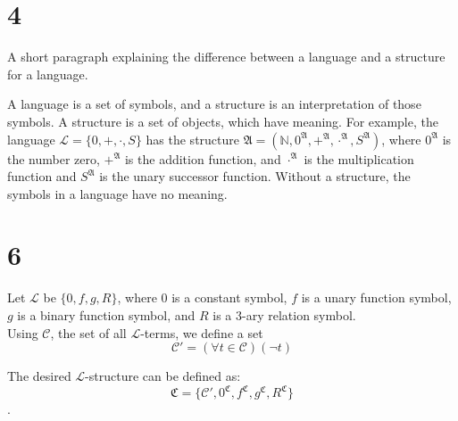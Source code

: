 \documentclass{article}
\begin{document}
\section*{4}
A short paragraph explaining the difference between a language
and a structure for a language.

A language is a set of symbols, and a structure is an interpretation of those symbols.
A structure is a set of objects, which have meaning. For example,
the language $\mathcal{L} = \{0,+,\cdot,S\}$ has the structure $\mathfrak{A} = (\mathbb{N}, 0^\mathfrak{A}, +^\mathfrak{A}, \cdot^\mathfrak{A}, S^\mathfrak{A})$,
where $0^\mathfrak{A}$ is the number zero, $+^\mathfrak{A}$ is the addition function, and $\cdot^\mathfrak{A}$ is the multiplication function
and $S^\mathfrak{A}$ is the unary successor function.
Without a structure, the symbols in a language have no meaning.

\section*{6}
Let $\mathcal{L}$ be $\{0, f, g, R\}$, where $0$ is a constant symbol, 
$f$ is a unary function symbol, $g$ is a binary function symbol, 
and $R$ is a $3$-ary relation symbol.\\

Using $\mathcal{C}$, the set of all $\mathcal{L}$-terms, 
we define a set 
$$
    \mathcal{C'} = (\forall t \in \mathcal{C})(\lnot{t})
$$

The desired $\mathcal{L}$-structure can be defined as:
$$
    \mathfrak{C} = \{ \mathcal{C'}, 0^\mathfrak{C}, f^\mathfrak{C}, g^\mathfrak{C}, R^\mathfrak{C} \}
$$.
\end{document}

